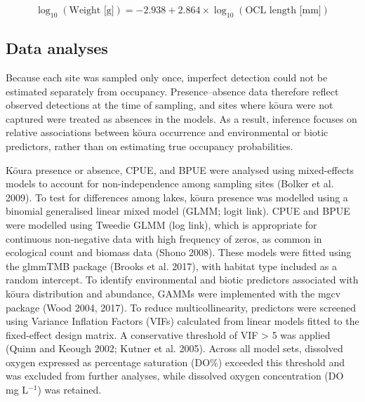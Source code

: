 \documentclass[
  12pt,
  a4paper,
  oneside]{scrbook}
\begin{document}
\[
\log_{10}(\text{Weight [g]}) = -2.938 + 2.864 \times \log_{10}(\text{OCL length [mm]})
\]

\subsection{Data analyses}\label{data-analyses}

Because each site was sampled only once, imperfect detection could not
be estimated separately from occupancy. Presence--absence data therefore
reflect observed detections at the time of sampling, and sites where
kōura were not captured were treated as absences in the models. As a
result, inference focuses on relative associations between kōura
occurrence and environmental or biotic predictors, rather than on
estimating true occupancy probabilities.

Kōura presence or absence, CPUE, and BPUE were analysed using
mixed-effects models to account for non-independence among sampling
sites (Bolker et al. 2009). To test for differences among lakes, kōura
presence was modelled using a binomial generalised linear mixed model
(GLMM; logit link). CPUE and BPUE were modelled using Tweedie GLMM (log
link), which is appropriate for continuous non-negative data with high
frequency of zeros, as common in ecological count and biomass data
(Shono 2008). These models were fitted using the glmmTMB package (Brooks
et al. 2017), with habitat type included as a random intercept. To
identify environmental and biotic predictors associated with kōura
distribution and abundance, GAMMs were implemented with the mgcv package
(Wood 2004, 2017). To reduce multicollinearity, predictors were screened
using Variance Inflation Factors (VIFs) calculated from linear models
fitted to the fixed-effect design matrix. A conservative threshold of
VIF \textgreater{} 5 was applied (Quinn and Keough 2002; Kutner et al.
2005). Across all model sets, dissolved oxygen expressed as percentage
saturation (DO\%) exceeded this threshold and was excluded from further
analyses, while dissolved oxygen concentration (DO mg L\(^{-1}\)) was
retained.
\end{document}

